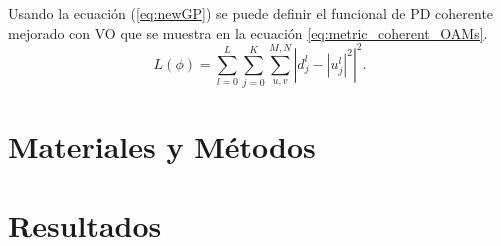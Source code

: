 Usando la ecuación (\ref{eq:newGP}) se puede definir el funcional de
PD coherente mejorado con VO que se muestra en la ecuación \ref{eq:metric_coherent_OAMs}.
\begin{equation}\label{eq:metric_coherent_OAMs}
L(\phi)= \sum_{l=0}^L\sum_{j=0}^{K} \sum_{u,v}^{M,N}  \left |d_{j}^l - |u_j^l|^2 \right | ^2.
\end{equation} 


\section{Materiales y Métodos}
\label{sec:ChPD_materiales_y_metodos}

\section{Resultados}
\label{sec:ChPD_resultados}

\newpage
\pagebreak[4]
